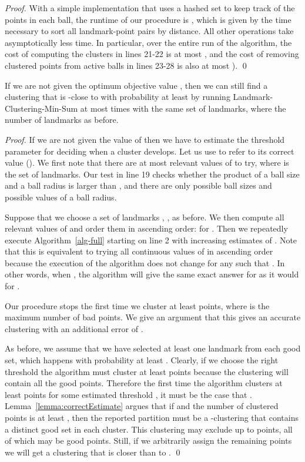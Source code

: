 \documentclass{llncs} \usepackage{algorithm}
\begin{document}
\begin{proof}
With a simple implementation that uses a hashed set to keep track of the points in each ball, the runtime of our procedure is , which is given by the time necessary to sort all landmark-point pairs by distance.  All other operations take asymptotically less time.  In particular, over the entire run of the algorithm, the cost of computing the clusters in lines 21-22 is at most , and the cost of removing clustered points from active balls in lines 23-28 is also at most ). \qed

\end{proof}

\begin{theorem}\label{lemma:unknownW}
If we are not given the optimum objective value , then we can still find a clustering that is -close to  with probability at least  by running Landmark-Clustering-Min-Sum at most  times with the same set of landmarks, where the number of landmarks  as before.
\end{theorem}

\begin{proof}

If we are not given the value of  then we have to estimate the threshold parameter  for deciding when a cluster develops.  Let us use  to refer to its correct value ().  We first note that there are at most  relevant values of  to try, where  is the set of landmarks.  Our test in line 19 checks whether the product of a ball size and a ball radius is larger than , and there are only  possible ball sizes and  possible values of a ball radius.

Suppose that we choose a set of landmarks , , as before. We then compute all  relevant values of  and order them in ascending order:  for .  Then we repeatedly execute Algorithm~\ref{alg-full} starting on line 2 with increasing estimates of .  Note that this is equivalent to trying all continuous values of  in ascending order because the execution of the algorithm does not change for any  such that .  In other words, when , the algorithm will give the same exact answer for  as it would for .

Our procedure stops the first time we cluster at least  points, where  is the maximum number of bad points.  We give an argument that this gives an accurate clustering with an additional error of .

As before, we assume that we have selected at least one landmark from each good set, which happens with probability at least .  Clearly, if we choose the right threshold  the algorithm must cluster at least  points because the clustering will contain all the good points.  Therefore the first time the algorithm clusters at least  points for some estimated threshold , it must be the case that .  Lemma~\ref{lemma:correctEstimate} argues that if  and the number of clustered points is at least , then the reported partition must be a -clustering that contains a distinct good set in each cluster.  This clustering may exclude up to  points, all of which may be good points.  Still, if we arbitrarily assign the remaining points we will get a clustering that is closer than  to . \qed

\end{proof}
\end{document}
